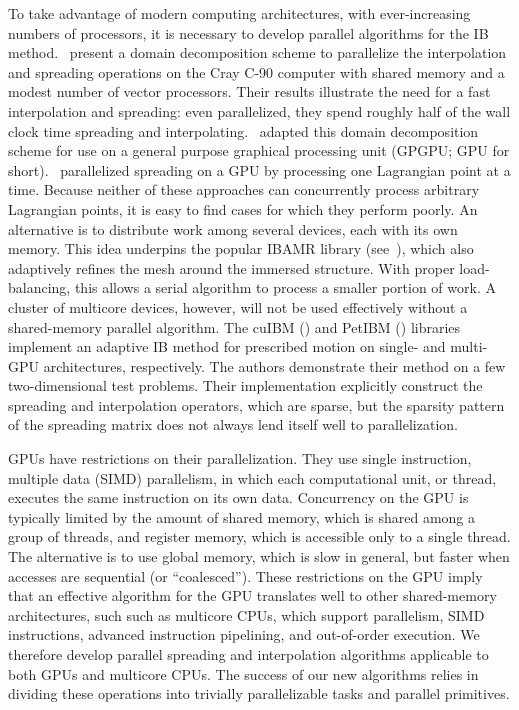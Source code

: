 To take advantage of modern computing architectures, with ever-increasing numbers of
processors, it is necessary to develop parallel algorithms for the IB method.~%
\cite{McQueen:1997kw} present a domain decomposition scheme to parallelize the
interpolation and spreading operations on the Cray C-90 computer with shared memory and a
modest number of vector processors. Their results illustrate the need for a fast
interpolation and spreading: even parallelized, they spend roughly half of the wall clock
time spreading and interpolating.~\cite{Fai:2013do} adapted this domain decomposition
scheme for use on a general purpose graphical processing unit (GPGPU; GPU for short).~%
\cite{Patel:2012tc} parallelized spreading on a GPU by processing one Lagrangian point at
a time. Because neither of these approaches can concurrently process arbitrary Lagrangian
points, it is easy to find cases for which they perform poorly. An alternative is to
distribute work among several devices, each with its own memory. This idea underpins the
popular IBAMR library (see~\cite{Griffith:2007uk,Griffith:2007do,Griffith:2009gg,
Griffith:2011gi,Griffith:2017id}), which also adaptively refines the mesh around the
immersed structure. With proper load-balancing, this allows a serial algorithm to process
a smaller portion of work. A cluster of multicore devices, however, will not be used
effectively without a shared-memory parallel algorithm. The cuIBM (\cite{Layton:2011um})
and PetIBM (\cite{Mesnard:2017te,Chuang:2018ej}) libraries implement an adaptive IB
method for prescribed motion on single- and multi-GPU architectures, respectively. The
authors demonstrate their method on a few two-dimensional test problems. Their
implementation explicitly construct the spreading and interpolation operators,
which are sparse, but the sparsity pattern of the spreading matrix does not always lend
itself well to parallelization.

GPUs have restrictions on their parallelization. They use single instruction,
multiple data (SIMD) parallelism, in which each computational unit, or thread, executes
the same instruction on its own data. Concurrency on the GPU is typically limited by the
amount of shared memory, which is shared among a group of threads, and register memory,
which is accessible only to a single thread. The alternative is to use global memory,
which is slow in general, but faster when accesses are sequential (or ``coalesced'').
These restrictions on the GPU imply that an effective algorithm for the GPU translates
well to other shared-memory architectures, such such as multicore CPUs, which support
parallelism, SIMD instructions, advanced instruction pipelining, and out-of-order
execution. We therefore develop parallel spreading and interpolation algorithms
applicable to both GPUs and multicore CPUs. The success of our new algorithms relies in
dividing these operations into trivially parallelizable tasks and parallel primitives.

